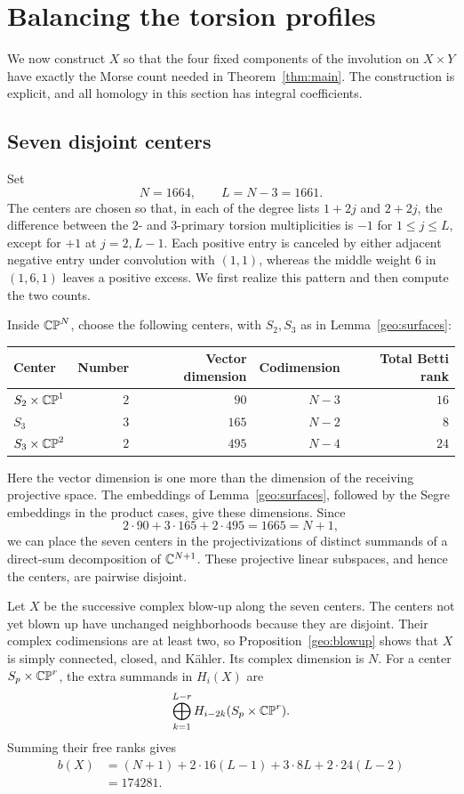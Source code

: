 \section{Balancing the torsion profiles}
\label{sec:construction}

We now construct $X$ so that the four fixed components of the
involution on $X\times Y$ have exactly the Morse count needed in
Theorem~\ref{thm:main}. The construction is explicit, and all homology
in this section has integral coefficients.

\subsection{Seven disjoint centers}
Set
\[
 N=1664,\qquad L=N-3=1661.
\]
The centers are chosen so that, in each of the degree lists $1+2j$
and $2+2j$, the difference between the $2$- and $3$-primary torsion
multiplicities is $-1$ for $1\leq j\leq L$, except for $+1$ at
$j=2,L-1$. Each positive entry is canceled by either adjacent
negative entry under convolution with $(1,1)$, whereas the middle
weight $6$ in $(1,6,1)$ leaves a positive excess. We first realize
this pattern and then compute the two counts.

Inside $\mathbb {CP}^N$, choose the following centers, with $S_2,S_3$ as in
Lemma~\ref{geo:surfaces}:
\begin{center}
\begin{tabular}{@{}lrrrr@{}}
\toprule
Center & Number & Vector dimension & Codimension & Total Betti rank\\
\midrule
$S_2\times\mathbb {CP}^1$ & $2$ & $90$ & $N-3$ & $16$\\
$S_3$ & $3$ & $165$ & $N-2$ & $8$\\
$S_3\times\mathbb {CP}^2$ & $2$ & $495$ & $N-4$ & $24$\\
\bottomrule
\end{tabular}
\end{center}
Here the vector dimension is one more than the dimension of the
receiving projective space. The embeddings of
Lemma~\ref{geo:surfaces}, followed by the Segre embeddings in the
product cases, give these dimensions. Since
\[
 2\cdot90+3\cdot165+2\cdot495=1665=N+1,
\]
we can place the seven centers in the projectivizations of distinct
summands of a direct-sum decomposition of $\mathbb C^{N+1}$. These projective
linear subspaces, and hence the centers, are pairwise disjoint.

Let $X$ be the successive complex blow-up along the seven centers.
The centers not yet blown up have unchanged neighborhoods because
they are disjoint. Their complex codimensions are at least two, so
Proposition~\ref{geo:blowup} shows that $X$ is simply connected,
closed, and K\"ahler. Its complex dimension is $N$.
For a center $S_p\times\mathbb {CP}^r$, the extra summands in $H_i(X)$ are
\begin{equation}
 \bigoplus_{k=1}^{L-r}H_{i-2k}(S_p\times\mathbb {CP}^r).
 \label{eq:center-shifts}
\end{equation}
Summing their free ranks gives
\begin{align}
 b(X)&=(N+1)+2\cdot16(L-1)+3\cdot8L+2\cdot24(L-2)
 \nonumber\\
 &=174281.
 \label{eq:rank-X-new}
\end{align}

